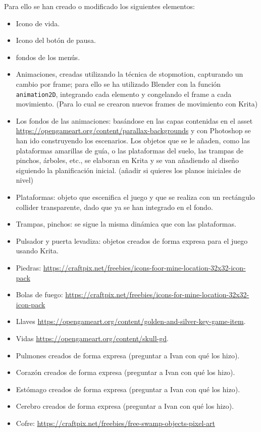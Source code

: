 \documentclass[12pt,a4paper,twoside,spanish]{article}      %
\begin{document}
Para ello se han creado o modificado los siguientes elementos:
\begin{itemize}
    \item Icono de vida.
    \item Icono del botón de pausa.
    \item fondos de los menús.
    \item Animaciones, creadas utilizando la técnica de stopmotion, capturando un cambio por frame; para ello se ha utilizado Blender con la función \texttt{animation2D}, integrando cada elemento y congelando el frame a cada movimiento. (Para lo cual se crearon nuevos frames de movimiento con Krita)
    \item Los fondos de las animaciones: basándose en las capas contenidas en el asset \url{https://opengameart.org/content/parallax-backgrounds} y con Photoshop se han ido construyendo los escenarios. Los objetos que se le añaden, como las plataformas amarillas de guía, o las plataformas del suelo, las trampas de pinchos, árboles, etc., se elaboran en Krita y se van añadiendo al diseño siguiendo la planificación inicial. (añadir si quieres los planos iniciales de nivel)
    \item Plataformas: objeto que escenifica el juego y que se realiza con un rectángulo collider transparente, dado que ya se han integrado en el fondo.
    \item Trampas, pinchos: se sigue la misma dinámica que con las plataformas.
    \item Pulsador y puerta levadiza: objetos creados de forma expresa para el juego usando Krita.
    \item Piedras: \url{https://craftpix.net/freebies/icons-foor-mine-location-32x32-icon-pack}
    \item Bolas de fuego: \url{https://craftpix.net/freebies/icons-for-mine-location-32x32-icon-pack}
    \item Llaves \url{https://opengameart.org/content/golden-and-silver-key-game-item}.
    \item Vidas \url{https://opengameart.org/content/skull-gd}.
    \item Pulmones creados de forma expresa (preguntar a Ivan con qué los hizo).
    \item Corazón creados de forma expresa (preguntar a Ivan con qué los hizo).
    \item Estómago creados de forma expresa (preguntar a Ivan con qué los hizo).
    \item Cerebro creados de forma expresa (preguntar a Ivan con qué los hizo).
    \item Cofre: \url{https://craftpix.net/freebies/free-swamp-objects-pixel-art}
\end{itemize}
\end{document}
